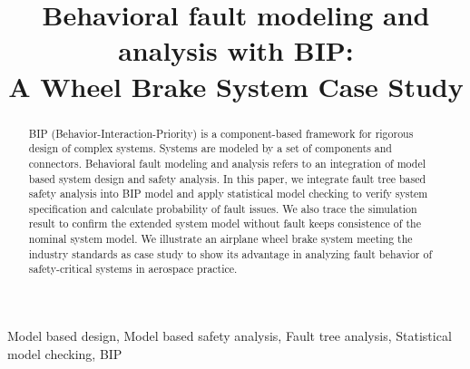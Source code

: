 \documentclass[conference]{IEEEtran}
\begin{document}
\title{Behavioral fault modeling and analysis with BIP:\\
	A Wheel Brake System Case Study\\}

\author{
\and
{}
}

\maketitle

\begin{abstract}
BIP (Behavior-Interaction-Priority) is a component-based framework for rigorous design of complex systems. 
 Systems are modeled by a set of components and connectors.
 Behavioral fault modeling and analysis refers to an integration of model based system design and safety analysis. 
 In this paper, we integrate fault tree based safety analysis into BIP model and 
 apply statistical model checking to verify system specification and calculate probability of fault issues. 
 We also trace the simulation result to confirm the extended system model without fault keeps consistence of the nominal system model.
 We illustrate an airplane wheel brake system meeting the industry standards as case study 
 to show its advantage in analyzing fault behavior of safety-critical systems in aerospace practice.
\end{abstract}

\begin{IEEEkeywords}
Model based design, Model based safety analysis, Fault tree analysis, Statistical model checking, BIP
\end{IEEEkeywords}
\end{document}

